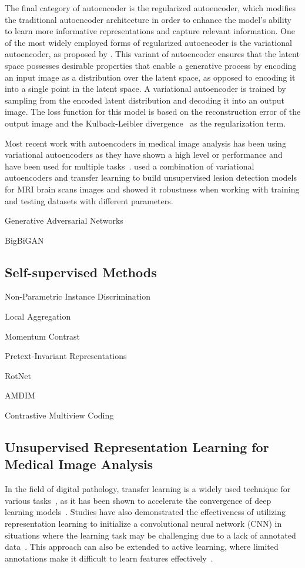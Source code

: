 The final category of autoencoder is the regularized autoencoder, which modifies the traditional autoencoder architecture in order to enhance the model's ability to learn more informative representations and capture relevant information. One of the most widely employed forms of regularized autoencoder is the variational autoencoder, as proposed by \cite{kingma2013auto}. This variant of autoencoder ensures that the latent space possesses desirable properties that enable a generative process by encoding an input image as a distribution over the latent space, as opposed to encoding it into a single point in the latent space. A variational autoencoder is trained by sampling from the encoded latent distribution and decoding it into an output image. The loss function for this model is based on the reconstruction error of the output image and the Kulback-Leibler divergence~\citep{kullback1951information} as the regularization term.

Most recent work with autoencoders in medical image analysis has been using variational autoencoders as they have shown a high level or performance and have been used for multiple tasks~\citep{wei2020recent}. \cite{akrami2020brain} used a combination of variational autoencoders and transfer learning to build unsupervised lesion detection models for MRI brain scans images and showed it robustness when working with training and testing datasets with different parameters. \cite{thiagarajan2020improving}

Generative Adversarial Networks

BigBiGAN

\subsection{Self-supervised Methods}
\label{subsec:self_supervised_methods}
Non-Parametric Instance Discrimination

Local Aggregation

Momentum Contrast

Pretext-Invariant Representations

RotNet

AMDIM

Contrastive Multiview Coding

\subsection{Unsupervised Representation Learning for Medical Image Analysis}
\label{subsec:unsupervise_representation_for_medical}
In the field of digital pathology, transfer learning is a widely used technique for various tasks~\citep{srinidhi2020deep}, as it has been shown to accelerate the convergence of deep learning models~\citep{bayramoglu2016transfer}. Studies have also demonstrated the effectiveness of utilizing representation learning to initialize a convolutional neural network (CNN) in situations where the learning task may be challenging due to a lack of annotated data~\citep{hou2016automatic}. This approach can also be extended to active learning, where limited annotations make it difficult to learn features effectively~\cite{carse2019active}.

